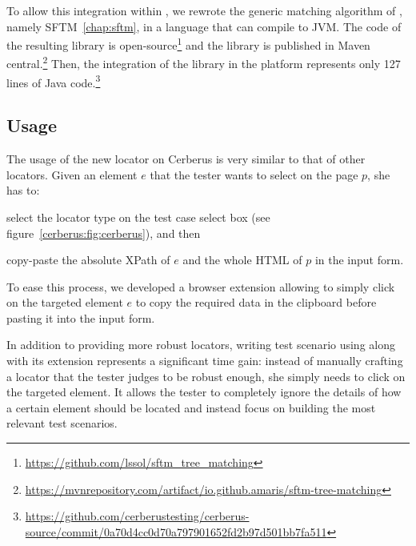 
To allow this integration within \cerberus, we rewrote the generic matching algorithm of \erratum, namely SFTM~\ref{chap:sftm}, in a language that can compile to JVM.
The code of the resulting library is open-source\footnote{\url{https://github.com/lssol/sftm\_tree\_matching}} and the library is published in Maven central.\footnote{\url{https://mvnrepository.com/artifact/io.github.amaris/sftm-tree-matching}}
Then, the integration of the \erratum library in the \cerberus platform represents only 127 lines of Java code.\footnote{\url{https://github.com/cerberustesting/cerberus-source/commit/0a70d4cc0d70a797901652fd2b97d501bb7fa511}}

\subsection{Usage}
The usage of the new \erratum locator on Cerberus is very similar to that of other locators.
Given an element $e$ that the tester wants to select on the page $p$, she has to:
\begin{compactenum}
\item select the \erratum locator type on the test case select box (see figure~\ref{cerberus:fig:cerberus}), and then
\item copy-paste the absolute XPath of $e$ and the whole HTML of $p$ in the input form.
\end{compactenum}
To ease this process, we developed a browser extension allowing to simply click on the targeted element $e$ to copy the required data in the clipboard before pasting it into the input form.

In addition to providing more robust locators, writing test scenario using \erratum along with its extension represents a significant time gain: instead of manually crafting a locator that the tester judges to be robust enough, she simply needs to click on the targeted element. 
It allows the tester to completely ignore the details of how a certain element should be located and instead focus on building the most relevant test scenarios.

